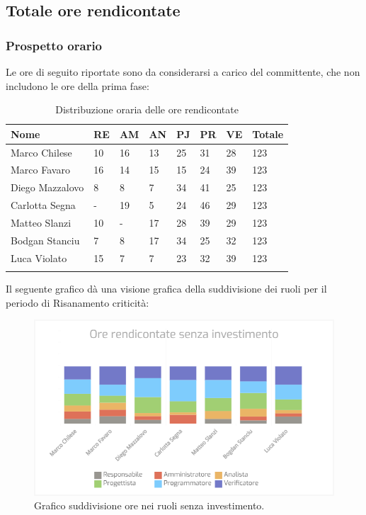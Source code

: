 \subsection{Totale ore rendicontate}
\subsubsection{Prospetto orario}

Le ore di seguito riportate sono da considerarsi a carico del committente, che non includono le ore della prima fase:

\begin{longtable}{|C{.30\textwidth}|C{.06\textwidth}|C{.06\textwidth}|C{.06\textwidth} | C{.06\textwidth}| C{.06\textwidth} | C{.06\textwidth} | C{.10\textwidth} |}
\hline
\textbf{Nome} & \textbf{RE} & \textbf{AM} & \textbf{AN} & \textbf{PJ} & \textbf{PR} & \textbf{VE} & \textbf{Totale}\\
\hline 
Marco Chilese & 10 & 16 & 13 & 25 & 31 & 28 & 123\\
\hline
Marco Favaro & 16 & 14 & 15 & 15 & 24 & 39 & 123\\
\hline
Diego Mazzalovo & 8 & 8 & 7 & 34 & 41 & 25 & 123\\
\hline
Carlotta Segna & - & 19 & 5 & 24 & 46 & 29 & 123\\
\hline
Matteo Slanzi & 10 & - & 17 & 28 & 39 & 29 & 123\\
\hline
Bodgan Stanciu & 7 & 8 & 17 & 34 & 25 & 32 & 123\\
\hline
Luca Violato & 15 & 7 & 7 & 23 & 32 & 39 & 123 \\
\hline

\caption{Distribuzione oraria delle ore rendicontate}
\label{Distribuzione oraria delle ore rendicontate}
\end{longtable}

Il seguente grafico dà una visione grafica della suddivisione dei ruoli per il periodo di Risanamento criticità:\begin{figure}[H]
	\centering
  		\includegraphics[width=1\linewidth]{./images/totale_ore_rendicontate_senza_investimento.png}
  		\caption{Grafico suddivisione ore nei ruoli senza investimento.}
  		\label{fig:grafico suddivione ruoli}
\end{figure}


